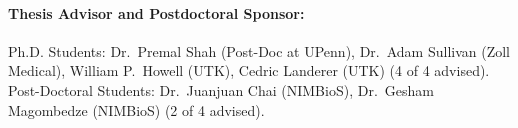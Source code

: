 \documentclass[10pt]{article}
\begin{document}
{\paragraph*{Thesis Advisor and Postdoctoral Sponsor:}
Ph.D. Students: Dr.~Premal Shah (Post-Doc at UPenn),  Dr.~Adam Sullivan (Zoll Medical), William P.~Howell (UTK),  Cedric Landerer (UTK) (4 of 4 advised).
Post-Doctoral Students: Dr.~Juanjuan Chai (NIMBioS), Dr.~Gesham Magombedze (NIMBioS) (2 of 4 advised).


}{}

\flushright{ \tiny\today}
\end{document}
